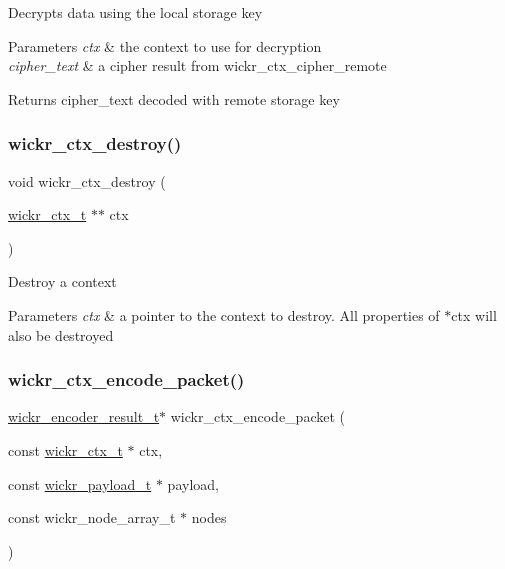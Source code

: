 Decrypts data using the local storage key


\begin{DoxyParams}{Parameters}
{\em ctx} & the context to use for decryption \\
\hline
{\em cipher\+\_\+text} & a cipher result from \textquotesingle{}wickr\+\_\+ctx\+\_\+cipher\+\_\+remote\textquotesingle{} \\
\hline
\end{DoxyParams}
\begin{DoxyReturn}{Returns}
\textquotesingle{}cipher\+\_\+text\textquotesingle{} decoded with remote storage key 
\end{DoxyReturn}
\mbox{\label{group__wickr__ctx_gaadfdef183c86992efc33b0d730c90327}} 
\subsubsection{\texorpdfstring{wickr\_ctx\_destroy()}{wickr\_ctx\_destroy()}}
{\footnotesize\ttfamily void wickr\+\_\+ctx\+\_\+destroy (\begin{DoxyParamCaption}\item[{\mbox{\hyperlink{structwickr__ctx}{wickr\+\_\+ctx\+\_\+t}} $\ast$$\ast$}]{ctx }\end{DoxyParamCaption})}

Destroy a context


\begin{DoxyParams}{Parameters}
{\em ctx} & a pointer to the context to destroy. All properties of \textquotesingle{}$\ast$ctx\textquotesingle{} will also be destroyed \\
\hline
\end{DoxyParams}
\mbox{\label{group__wickr__ctx_ga3498fb1a966dd49c1f3b806a388533ea}} 
\subsubsection{\texorpdfstring{wickr\_ctx\_encode\_packet()}{wickr\_ctx\_encode\_packet()}}
{\footnotesize\ttfamily \mbox{\hyperlink{structwickr__encoder__result}{wickr\+\_\+encoder\+\_\+result\+\_\+t}}$\ast$ wickr\+\_\+ctx\+\_\+encode\+\_\+packet (\begin{DoxyParamCaption}\item[{const \mbox{\hyperlink{structwickr__ctx}{wickr\+\_\+ctx\+\_\+t}} $\ast$}]{ctx,  }\item[{const \mbox{\hyperlink{structwickr__payload}{wickr\+\_\+payload\+\_\+t}} $\ast$}]{payload,  }\item[{const wickr\+\_\+node\+\_\+array\+\_\+t $\ast$}]{nodes }\end{DoxyParamCaption})}

